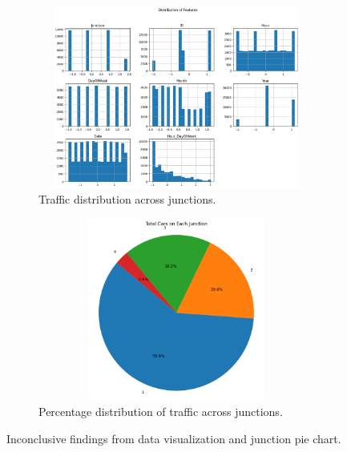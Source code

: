 \documentclass{IEEEtran}
\begin{document}
\begin{figure}[h]
    \centering
    \begin{subfigure}{0.48\textwidth}
        \centering
        \includegraphics[width=10cm, height=6cm]{data_visualisation.png}
        \caption{Traffic distribution across junctions.}
        \label{fig:data_visualization}
    \end{subfigure}
    \hfill
    \begin{subfigure}{0.48\textwidth}
        \centering
        \includegraphics[width=10cm, height=6cm]{pie_chart.png}
        \caption{Percentage distribution of traffic across junctions.}
        \label{fig:junction_pie_chart}
    \end{subfigure}
    \caption{Inconclusive findings from data visualization and junction pie chart.}
\end{figure}
\clearpage
\end{document}

